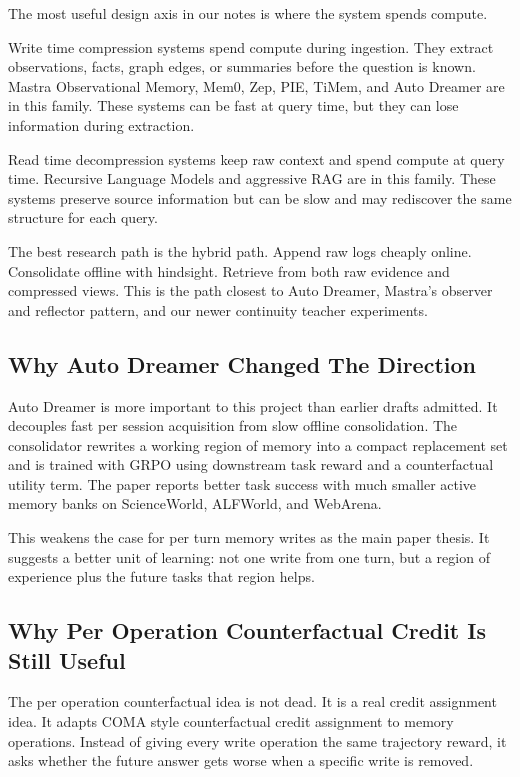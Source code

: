 \documentclass[11pt]{article}
\begin{document}
The most useful design axis in our notes is where the system spends compute.

Write time compression systems spend compute during ingestion. They extract observations, facts, graph edges, or summaries before the question is known. Mastra Observational Memory, Mem0, Zep, PIE, TiMem, and Auto Dreamer are in this family. These systems can be fast at query time, but they can lose information during extraction.

Read time decompression systems keep raw context and spend compute at query time. Recursive Language Models and aggressive RAG are in this family. These systems preserve source information but can be slow and may rediscover the same structure for each query.

The best research path is the hybrid path. Append raw logs cheaply online. Consolidate offline with hindsight. Retrieve from both raw evidence and compressed views. This is the path closest to Auto Dreamer, Mastra's observer and reflector pattern, and our newer continuity teacher experiments.

\subsection{Why Auto Dreamer Changed The Direction}

Auto Dreamer is more important to this project than earlier drafts admitted. It decouples fast per session acquisition from slow offline consolidation. The consolidator rewrites a working region of memory into a compact replacement set and is trained with GRPO using downstream task reward and a counterfactual utility term. The paper reports better task success with much smaller active memory banks on ScienceWorld, ALFWorld, and WebArena.

This weakens the case for per turn memory writes as the main paper thesis. It suggests a better unit of learning: not one write from one turn, but a region of experience plus the future tasks that region helps.

\subsection{Why Per Operation Counterfactual Credit Is Still Useful}

The per operation counterfactual idea is not dead. It is a real credit assignment idea. It adapts COMA style counterfactual credit assignment to memory operations. Instead of giving every write operation the same trajectory reward, it asks whether the future answer gets worse when a specific write is removed.
\end{document}
